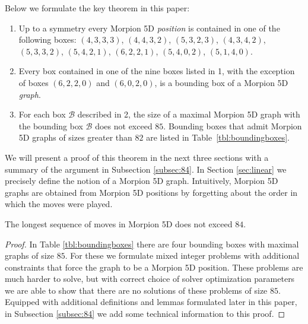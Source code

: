 Below we formulate the key theorem in this paper: %
\begin{theorem}
\begin{enumerate}
\item Up to a symmetry every Morpion 5D {\em position} is contained in one of the following boxes:
$(4, 3, 3, 3)$, $(4, 4, 3, 2)$, $(5, 3, 2, 3)$, $(4, 3, 4, 2)$, $(5, 3, 3, 2)$, $(5, 4, 2, 1)$, 
$(6, 2, 2, 1)$, $(5, 4, 0, 2)$, $(5, 1, 4, 0)$. \label{thm:boxes:list}
\item Every box contained in one of the nine boxes listed in 1, with the exception of boxes $(6, 2, 2, 0)$ 
  and $(6, 0, 2, 0)$, is a bounding box of a Morpion 5D {\em graph}.
\item For each box $\mathcal{B}$ described in 2, the size of a maximal Morpion 5D graph with the bounding box $\mathcal{B}$ does not exceed $85$.
  Bounding boxes that admit Morpion 5D graphs of sizes greater than $82$ are listed 
    in Table~\ref{tbl:boundingboxes}. 
\end{enumerate} 
\label{thm:boxes}
\end{theorem}
We will present a proof of this theorem in the next three sections with a summary of the argument in Subsection \ref{subsec:84}. 
In Section \ref{sec:linear} we precisely define the notion of a Morpion 5D graph. Intuitively, Morpion 5D graphs are obtained from Morpion 5D positions by forgetting about the order in which the moves were played.





\begin{corollary}
\label{cor:84}
The longest sequence of moves in Morpion 5D does not exceed $84$.
\end{corollary}
\begin{proof} 
In Table \ref{tbl:boundingboxes} there are four bounding boxes with maximal graphs of size $85$. 
For these we formulate mixed integer problems with additional constraints that force the graph to
  be a Morpion 5D position.
These problems are much harder to solve, but with correct choice of solver optimization parameters we are able to show
  that there are no solutions of these problems of size $85$. Equipped with additional definitions and lemmas formulated later in this paper, in Subsection \ref{subsec:84} we add some technical 
information to this proof. 
\end{proof}
